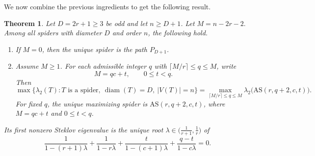 \documentclass[11pt]{article}
\newtheorem{theorem}{Theorem}[section]
\theoremstyle{remark}
\newcommand{\diam}{\operatorname{diam}}
\newcommand{\AS}{\mathrm{AS}}
\begin{document}
We now combine the previous ingredients to get the following result.

\begin{theorem}\label{thm:main}
Let $D=2r+1\ge 3$ be odd and let $n\ge D+1$.
Let $M=n-2r-2.$
Among all spiders with diameter $D$ and order $n$, the following hold.
\begin{enumerate}[label=\textnormal{(\roman*)}]
    \item If $M=0$, then the unique spider is the path $P_{D+1}$.
    \item Assume $M\ge 1$. For each admissible integer $q$ with $\lceil M/r\rceil\le q\le M$, write
    $$
    M=qc+t,\qquad 0\le t<q.
    $$
    Then
    $$
    \max\{\lambda_2(T): T\text{ is a spider},\ \diam(T)=D,\ |V(T)|=n\}
    =
    \max_{\lceil M/r\rceil\le q\le M} \lambda_2\bigl(\AS(r,q+2,c,t)\bigr).
    $$
    For fixed $q$, the unique maximizing spider is $\AS(r,q+2,c,t)$, where $M=qc+t$ and $0\le t<q$.
\end{enumerate}
Its first nonzero Steklov eigenvalue is the unique root
$\lambda\in\bigl(\frac1{r+1},\frac1r\bigr)$ of
\begin{equation}\label{eq:balanced-root}
\frac{1}{1-(r+1)\lambda}+
\frac{1}{1-r\lambda}+
\frac{t}{1-(c+1)\lambda}+
\frac{q-t}{1-c\lambda}=0.
\end{equation}
\end{theorem}
\end{document}
